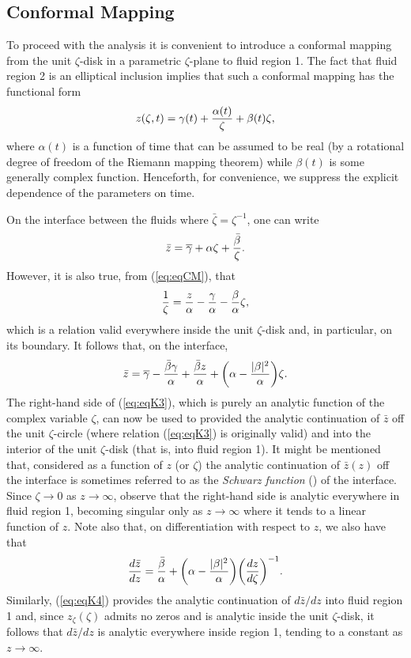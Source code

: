 \documentclass[fleqn]{jleo}
\begin{document}
\subsection{Conformal Mapping}
To proceed with the analysis it is convenient to introduce
a conformal mapping from the unit $\zeta$-disk in 
a parametric $\zeta$-plane to fluid region 1.
The fact that fluid region 2 is an elliptical inclusion 
implies that such a conformal mapping
has the functional form
\begin{equation}
z(\zeta,t) = \gamma(t) + {\alpha(t) \over \zeta} + \beta(t) \zeta,\label{eq:eqCM}
\end{equation}
where $\alpha(t)$ is a function of time that can be assumed to
be real (by a rotational degree of freedom of the Riemann mapping
theorem) while $\beta(t)$ is some generally complex function.
Henceforth, for convenience, we suppress the explicit
dependence of the parameters on time.

On the interface between the fluids where $\bar{\zeta} = \zeta^{-1}$,
one can write
\begin{equation}
\bar{z} = \overline \gamma + \alpha \zeta +{\bar{\beta} \over \zeta}.
\end{equation}
However, it is also true, from (\ref{eq:eqCM}), that
\begin{equation}
{1 \over \zeta} = {z \over \alpha} - {\gamma \over \alpha}
- {\beta \over \alpha} \zeta,
\end{equation}
which is a relation valid everywhere inside the unit $\zeta$-disk and,
in particular, on its boundary. It follows that, on the interface,
\begin{equation}
\bar{z} = \overline \gamma - {\bar{\beta} \gamma \over \alpha}
+{\bar{\beta} z \over \alpha} + {\left(\alpha - {|\beta|^2 \over \alpha} \right)} \zeta.
\label{eq:eqK3}
\end{equation}
The right-hand side of (\ref{eq:eqK3}), which is purely an analytic
function of the complex variable $\zeta$, can now be used to
provided the analytic continuation of $\bar{z}$
off the unit $\zeta$-circle (where relation (\ref{eq:eqK3}) is originally valid) and into the interior of the unit $\zeta$-disk (that is, into fluid region 1). It might be mentioned that, considered as a function of $z$ (or $\zeta$) the analytic continuation of $\bar z(z)$ off the interface is sometimes
referred to as the {\em Schwarz function} (\citealt{Davis}) of the interface.
Since $\zeta \to 0$ as $z \to \infty$,  observe that  the right-hand side
is analytic everywhere in fluid region 1, becoming singular only as $z \to
\infty$ where it tends to a linear function of $z$. Note also that, on differentiation
with respect to $z$, we also have that
\begin{equation}
{d \bar z \over dz} = {\bar \beta \over \alpha}
+ {\left(\alpha - {|\beta|^2 \over \alpha} \right)} 
{\left({dz \over d \zeta} \right )}^{-1}.\label{eq:eqK4}
\end{equation}
Similarly, (\ref{eq:eqK4}) provides the analytic continuation of $d \bar{z}/dz$ into fluid region 1 and, since $z_\zeta(\zeta)$ admits no zeros and is analytic
inside the unit $\zeta$-disk, it follows that $d \bar z/dz$ is analytic everywhere inside region 1, tending to a constant as $z \to \infty$.
\end{document}
